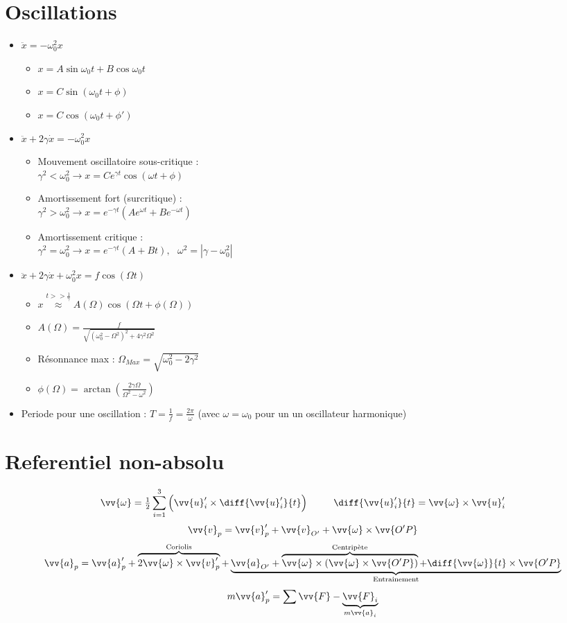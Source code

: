 \documentclass[landscape,a4paper]{article}
\newcommand{\F}{\ensuremath{\vv{F}}}
\newcommand{\vi}{\ensuremath{\vv{v}}}
\newcommand{\vian}{\ensuremath{\vv{\omega}}}
\newcommand{\ac}{\ensuremath{\vv{a}}}
\begin{document}
\begin{multicols}{4}
  \section{Oscillations}
  \begin{itemize}
    \item \(\ddot{x}=-\omega_0^2x\)
      \begin{itemize}
        \item \(x=A\sin\omega_0t + B\cos\omega_0t\)
        \item \(x=C\sin(\omega_0t+\phi)\)
        \item \(x=C\cos(\omega_0t+\phi')\)
      \end{itemize}
    \item \(\ddot{x}+2\gamma\dot{x}=-\omega_0^2x\)
      \begin{itemize}
        \item Mouvement oscillatoire sous-critique :\\ \(\gamma^2 < \omega_0^2 \rightarrow x = Ce^{\gamma t}\cos(\omega t + \phi)\)
        \item Amortissement fort (surcritique) :\\ \(\gamma^2 > \omega_0^2 \rightarrow x = e^{-\gamma t}(Ae^{\omega t} + Be^{-\omega t})\)
        \item Amortissement critique :\\ \(\gamma^2 = \omega^2_0 \rightarrow x = e^{-\gamma t}(A+Bt),\,\,\,\, \omega^2=|\gamma - \omega_0^2|\)
      \end{itemize}
    \item \(\ddot{x} + 2\gamma\dot{x} + \omega_0^2x=f\cos(\Omega t)\)
      \begin{itemize}
        \item \(x \overset{t>>\frac{1}{\gamma}}{\approx} A(\Omega)\cos(\Omega t + \phi(\Omega))\)
        \item \(A(\Omega)=\frac{f}{\sqrt{(\omega_0^2 - \Omega^2)^2 + 4\gamma^2\Omega^2}}\)
        \item Résonnance max : \(\Omega_{Max} = \sqrt{\omega_0^2 - 2\gamma^2}\)
        \item \(\phi(\Omega) = \arctan(\frac{2\gamma\Omega}{\Omega^2 - \omega^2})\)
      \end{itemize}
    \item Periode pour une oscillation : \(T=\frac{1}{f}=\frac{2\pi}{\omega}\) (avec \(\omega = \omega_0\) pour un un oscillateur harmonique)
  \end{itemize}

  \section{Referentiel non-absolu}
  \[
    \vian=\tfrac{1}{2}\sum_{i=1}^{3}\left(\vv{u}_i'\times\diff{\vv{u}_i'}{t}\right) \phantom{thisis} \diff{\vv{u}_i'}{t}=\vian\times\vv{u}_i'
  \]
  \[
    \vi_p=\vi_p'+\vi_{O'} + \vian\times\vv{O'P}
  \]
  \[
    \ac_p = \ac_p' + \overbrace{2\vian\times\vi_p'}^{\text{Coriolis}} + \underbrace{\ac_{O'} + \overbrace{\vian\times(\vian\times\vv{O'P})}^{\text{Centripète}} + \diff{\vian}{t}\times\vv{O'P}}_{\text{Entrainement}}
  \]
  \[
    m\ac_p'=\sum\F - \underbrace{\F_i}_{m\ac_i}
  \]


\end{multicols}
\end{document}
